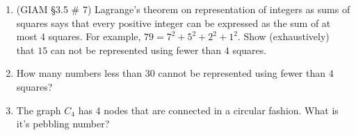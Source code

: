 \documentclass{amsart}
\begin{document}
\begin{enumerate}
\vfill

\item (GIAM \S 3.5 \# 7) Lagrange's theorem on representation of integers as sums of squares
says that every positive integer can be expressed as the sum of at most 
$4$ squares.  For example, $79 = 7^2 + 5^2 + 2^2 + 1^2$.  Show (exhaustively) 
that $15$ can not be represented using fewer than $4$ squares.

\vfill 

\newpage

\item How many numbers less than 30 cannot be represented using fewer than $4$ squares?

\vfill

\item The graph $C_4$ has 4 nodes that are connected in a circular fashion.  What is it's pebbling number?

\vfill

\end{enumerate}
\end{document}
